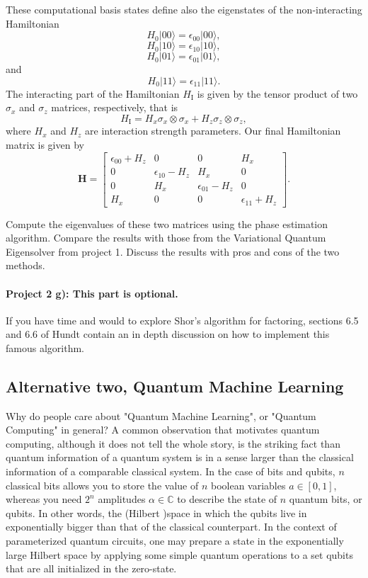 \documentclass[%
oneside,                 %
final,                   %
10pt]{article}
\begin{document}
These computational basis states define also the eigenstates of the non-interacting  Hamiltonian
\[
H_0\vert 00 \rangle = \epsilon_{00}\vert 00 \rangle,
\]
\[
H_0\vert 10 \rangle = \epsilon_{10}\vert 10 \rangle,
\]
\[
H_0\vert 01 \rangle = \epsilon_{01}\vert 01 \rangle,
\]
and
\[
H_0\vert 11 \rangle = \epsilon_{11}\vert 11 \rangle.
\]
The interacting part of the Hamiltonian $H_{\mathrm{I}}$ is given by the tensor product of two $\sigma_x$ and $\sigma_z$  matrices, respectively, that is
\[
H_{\mathrm{I}}=H_x\sigma_x\otimes\sigma_x+H_z\sigma_z\otimes\sigma_z,
\]
where $H_x$ and $H_z$ are interaction strength parameters. Our final Hamiltonian matrix is given by
\[
\bm{H}=\begin{bmatrix} \epsilon_{00}+H_z & 0 & 0 & H_x \\
                       0  & \epsilon_{10}-H_z & H_x & 0 \\
		       0 & H_x & \epsilon_{01}-H_z & 0 \\
		       H_x & 0 & 0 & \epsilon_{11} +H_z \end{bmatrix}.
\] 

Compute the eigenvalues of these two matrices using the phase
estimation algorithm. Compare the results with those from the
Variational Quantum Eigensolver from project 1.  Discuss the results with pros and cons of the two methods.

\paragraph{Project 2 g): This part is optional.}
If you have time and would to explore Shor's algorithm for factoring, sections 6.5 and 6.6 of Hundt contain an in depth discussion on how to implement this famous algorithm. 

\subsection*{Alternative two, Quantum Machine Learning}

Why do people care about "Quantum Machine Learning", or "Quantum Computing" in general? A common observation that motivates quantum computing,
although it does not tell the whole story, is the striking fact than quantum information of a quantum system is in a sense
larger than the classical information of a comparable classical system. In the case of
bits and qubits, $n$ classical bits allows you to store the value of $n$ boolean variables $a \in [0,1]$,
whereas you need $2^n$ amplitudes $\alpha \in \mathbb{C}$ to describe the state of $n$ quantum bits, or qubits.
In other words, the (Hilbert )space in which the qubits live in exponentially bigger than that of the classical
counterpart. In the context of parameterized quantum circuits, one may prepare a state in the exponentially
large Hilbert space by applying some simple quantum operations to a set qubits that are all initialized in the zero-state.
\end{document}
